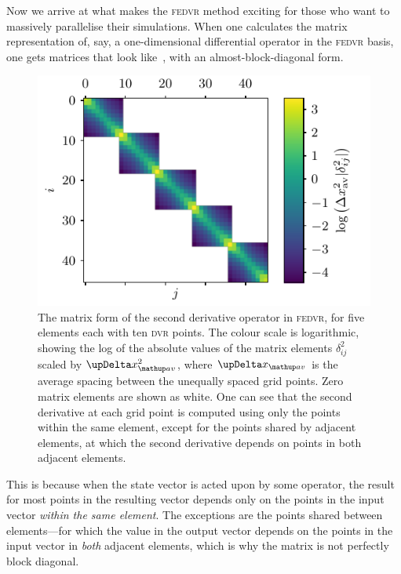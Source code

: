 Now we arrive at what makes the \textsc{fedvr} method exciting for those who want to massively parallelise their simulations. When one calculates the matrix representation of, say, a one-dimensional differential operator in the \textsc{fedvr} basis, one gets matrices that look like~, with an almost-block-diagonal form.

\begin{figure}[t]
    \centerfloat
    \includegraphics{figures/numerics/fedvr_D2_operator.pdf}
    \caption{The matrix form of the second derivative operator in \textsc{fedvr}, for five elements each with ten \textsc{dvr} points. The colour scale is logarithmic, showing the log of the absolute values of the matrix elements $\delta^2_{ij}$ scaled by $\upDelta x_\up{av}^2$, where $\upDelta x_\up{av}$ is the average spacing between the unequally spaced grid points. Zero matrix elements are shown as white. One can see that the second derivative at each grid point is computed using only the points within the same element, except for the points shared by adjacent elements, at which the second derivative depends on points in both adjacent elements.}
    \label{fig:fedvr_D2_operator}
\end{figure}

 This is because when the state vector is acted upon by some operator, the result for most points in the resulting vector depends only on the points in the input vector \emph{within the same element}. The exceptions are the points shared between elements---for which the value in the output vector depends on the points in the input vector in \emph{both} adjacent elements, which is why the matrix is not perfectly block diagonal.


